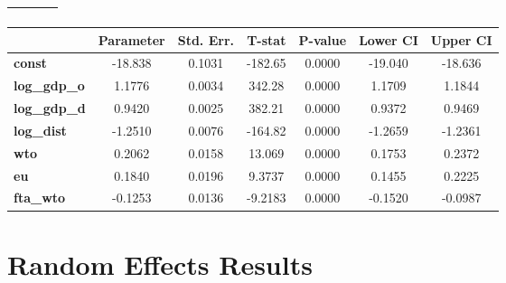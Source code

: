 \documentclass{article}
\begin{document}
\begin{center}
\begin{tabular}{lclc}
\textbf{}                  &                    & \textbf{                     }   &                  \\
\bottomrule
\end{tabular}
\begin{tabular}{lcccccc}
                     & \textbf{Parameter} & \textbf{Std. Err.} & \textbf{T-stat} & \textbf{P-value} & \textbf{Lower CI} & \textbf{Upper CI}  \\
\midrule
\textbf{const}       &      -18.838       &       0.1031       &     -182.65     &      0.0000      &      -19.040      &      -18.636       \\
\textbf{log\_gdp\_o} &       1.1776       &       0.0034       &      342.28     &      0.0000      &       1.1709      &       1.1844       \\
\textbf{log\_gdp\_d} &       0.9420       &       0.0025       &      382.21     &      0.0000      &       0.9372      &       0.9469       \\
\textbf{log\_dist}   &      -1.2510       &       0.0076       &     -164.82     &      0.0000      &      -1.2659      &      -1.2361       \\
\textbf{wto}         &       0.2062       &       0.0158       &      13.069     &      0.0000      &       0.1753      &       0.2372       \\
\textbf{eu}          &       0.1840       &       0.0196       &      9.3737     &      0.0000      &       0.1455      &       0.2225       \\
\textbf{fta\_wto}    &      -0.1253       &       0.0136       &     -9.2183     &      0.0000      &      -0.1520      &      -0.0987       \\
\bottomrule
\end{tabular}
\end{center}\section*{Random Effects Results}
\end{document}
